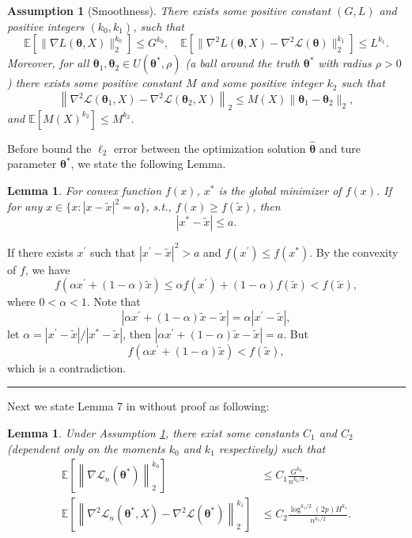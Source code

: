 \documentclass[12pt]{article}
\numberwithin{equation}{section}
\newtheorem{lemma}[theorem]{Lemma}
\newtheorem{assumption}[theorem]{Assumption}
\newenvironment{proof}{{\bf Proof:}}{\hfill\rule{2mm}{2mm}}
\begin{document}
\begin{assumption}[Smoothness]\label{assumption3.2}
	There exists some positive constant $(G,L)$ and positive integers $(k_0,k_1)$, such that
	\begin{equation}
	\mathbb{E}\left[\|\nabla L(\boldsymbol{\theta},X)\|_2^{k_0}\right]\leq G^{k_0},\quad \mathbb{E}\left[\|\nabla^2L(\boldsymbol{\theta},X)-\nabla^2\mathcal{L}(\boldsymbol{\theta})\|_2^{k_1}\right]\leq L^{k_1}.
	\end{equation}
	Moreover, for all $\boldsymbol{\theta}_1,\boldsymbol{\theta}_2\in U(\boldsymbol{\theta}^{*},\rho)$ (a ball around the truth $\boldsymbol{\theta}^{*}$ with radius $\rho>0$) there exists some positive constant $M$ and some positive integer $k_2$ such that
	\begin{equation}
	\left\|\nabla^2\mathcal{L}(\boldsymbol{\theta}_1,X)-\nabla^2\mathcal{L}(\boldsymbol{\theta}_2,X)\right\|_2\leq M(X)\|\boldsymbol{\theta}_1-\boldsymbol{\theta}_2\|_2,
	\end{equation}
	and $\mathbb{E}[M(X)^{k_2}]\leq M^{k_2}$.
\end{assumption}
Before bound the $\ell_2$ error between the optimization solution $\widehat{\boldsymbol{\theta}}$ and ture parameter $\boldsymbol{\theta}^{*}$, we state the following Lemma.
\begin{lemma}\label{lemma 3.4}
	For convex function $f(x)$, $x^{*}$ is the global minimizer of $f(x)$. If for any $x \in \{x:|x-\tilde x|^2= a\}$, s.t., $f(x)\geq f(\tilde x)$, then
	$$
	|x^{*}-\tilde x|\leq a.
	$$
\end{lemma}
\begin{proof}
	If there exists $x^{'}$ such that $|x^{'}-\tilde x|^2>a$ and $f(x^{'})\leq f(x^{*})$. By the convexity of $f$, we have 
	$$
	f(\alpha x^{'}+(1-\alpha) \tilde x)\leq \alpha f(x^{'})+(1-\alpha)f(\tilde x)< f(\tilde x),
	$$
	where $0<\alpha<1$. Note that
	$$|\alpha x^{'}+(1-\alpha) \tilde x-\tilde x|=\alpha|x^{'}-\tilde x|,$$
	let $\alpha=|x^{'}-\tilde x|/|x^{*}-\tilde x|$, then $|\alpha x^{'}+(1-\alpha) \tilde x-\tilde x|=a$. But
	$$
	f(\alpha x^{'}+(1-\alpha) \tilde x)< f(\tilde x),
	$$
	which is a contradiction.
\end{proof}\newline
Next we state Lemma 7 in \citet{zhang2013communication} without proof as following:
\begin{lemma}
	Under Assumption \ref{assumption3.2}, there exist some constants $C_1$ and $C_2$ (dependent only on the moments $k_0$ and $k_1$ respectively) such that
	\begin{align}
	\mathbb{E}\left[\left\|\nabla \mathcal{L}_n\left(\boldsymbol{\theta}^{*}\right)\right\|_{2}^{k_{0}}\right] &\leq C_1 \frac{G^{k_{0}}}{n^{k_{0} / 2}},\label{3.6}\\
	\mathbb{E}\left[\left\|\nabla^{2} \mathcal{L}_n\left(\boldsymbol{\theta}^{*},X\right)-\nabla^{2} \mathcal{L}\left(\boldsymbol{\theta}^{*}\right)\right\|_{2}^{k_{1}}\right] &\leq C_2 \frac{\log ^{k_{1} / 2}(2 p) H^{k_{1}}}{n^{k_{1} / 2}}.\label{3.7}
	\end{align}
\end{lemma}
\end{document}
